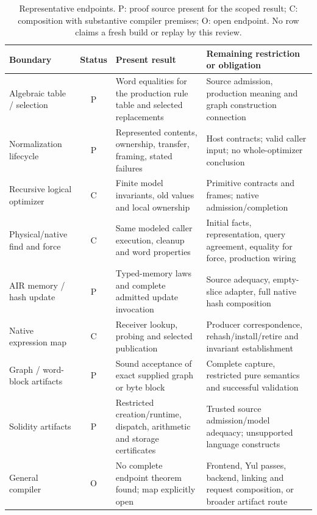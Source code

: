 \documentclass[conference]{IEEEtran}
\begin{document}
\begin{table}[t]
\caption{Representative endpoints. P: proof source present for the scoped result;
C: composition with substantive compiler premises; O: open endpoint. No row
claims a fresh build or replay by this review.}
\label{tab:status}
\centering\small
\begin{tabularx}{\textwidth}{@{}>{\raggedright\arraybackslash}p{}c>{\raggedright\arraybackslash}p{}>{\raggedright\arraybackslash}X@{}}
\toprule
Boundary & Status & Present result & Remaining restriction or obligation\\
\midrule
Algebraic table / selection & P & Word equalities for the production rule table and selected replacements & Source admission, production meaning and graph construction connection\\
Normalization lifecycle & P & Represented contents, ownership, transfer, framing, stated failures & Host contracts; valid caller input; no whole-optimizer conclusion\\
Recursive logical optimizer & C & Finite model invariants, old values and local ownership & Primitive contracts and frames; native admission/completion\\
Physical/native find and force & C & Same modeled caller execution, cleanup and word properties & Initial facts, representation, query agreement, equality for force, production wiring\\
AIR memory / hash update & P & Typed-memory laws and complete admitted update invocation & Source adequacy, empty-slice adapter, full native hash composition\\
Native expression map & C & Receiver lookup, probing and selected publication & Producer correspondence, rehash/install/retire and invariant establishment\\
Graph / word-block artifacts & P & Sound acceptance of exact supplied graph or byte block & Complete capture, restricted pure semantics and successful validation\\
Solidity artifacts & P & Restricted creation/runtime, dispatch, arithmetic and storage certificates & Trusted source admission/model adequacy; unsupported language constructs\\
General compiler & O & No complete endpoint theorem found; map explicitly open & Frontend, Yul passes, backend, linking and request composition, or broader artifact route\\
\bottomrule
\end{tabularx}
\end{table}
\end{document}
